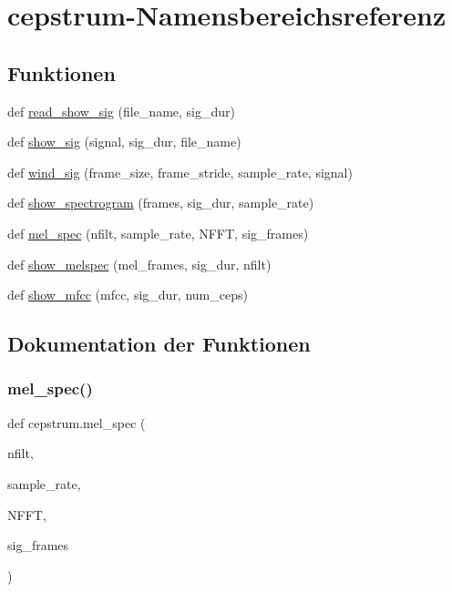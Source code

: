 \hypertarget{namespacecepstrum}{}\section{cepstrum-\/\+Namensbereichsreferenz}
\label{namespacecepstrum}
\subsection*{Funktionen}
\begin{DoxyCompactItemize}
\item 
def \mbox{\hyperlink{namespacecepstrum_af44fa6a9e5f5e8db043cb60b38894085}{read\+\_\+show\+\_\+sig}} (file\+\_\+name, sig\+\_\+dur)
\item 
def \mbox{\hyperlink{namespacecepstrum_ae9a55612bcfeaa372d11036a16b98527}{show\+\_\+sig}} (signal, sig\+\_\+dur, file\+\_\+name)
\item 
def \mbox{\hyperlink{namespacecepstrum_ab6397c51bd13894929df2b4c206fecfa}{wind\+\_\+sig}} (frame\+\_\+size, frame\+\_\+stride, sample\+\_\+rate, signal)
\item 
def \mbox{\hyperlink{namespacecepstrum_a3db8285f132510ae674c893a651ca971}{show\+\_\+spectrogram}} (frames, sig\+\_\+dur, sample\+\_\+rate)
\item 
def \mbox{\hyperlink{namespacecepstrum_ae0a1b2c79db9e80e8dfe58fd9dfb9ad6}{mel\+\_\+spec}} (nfilt, sample\+\_\+rate, N\+F\+FT, sig\+\_\+frames)
\item 
def \mbox{\hyperlink{namespacecepstrum_a3e21b1c622287001e82e62c0c64d0643}{show\+\_\+melspec}} (mel\+\_\+frames, sig\+\_\+dur, nfilt)
\item 
def \mbox{\hyperlink{namespacecepstrum_a43917229e1efedf7a3439fdfc6b2890a}{show\+\_\+mfcc}} (mfcc, sig\+\_\+dur, num\+\_\+ceps)
\end{DoxyCompactItemize}


\subsection{Dokumentation der Funktionen}
\mbox{\label{namespacecepstrum_ae0a1b2c79db9e80e8dfe58fd9dfb9ad6}} 
\subsubsection{\texorpdfstring{mel\+\_\+spec()}{mel\_spec()}}
{\footnotesize\ttfamily def cepstrum.\+mel\+\_\+spec (\begin{DoxyParamCaption}\item[{}]{nfilt,  }\item[{}]{sample\+\_\+rate,  }\item[{}]{N\+F\+FT,  }\item[{}]{sig\+\_\+frames }\end{DoxyParamCaption})}

